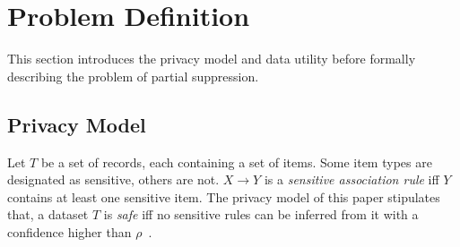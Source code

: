 \section{Problem Definition}
\label{sec:prob}

This section %
introduces the privacy model and data utility before formally describing
the problem of partial suppression.


\subsection{Privacy Model}
Let $T$ be a set of records, each containing a set of items. 
Some item types are designated as sensitive, others are not. 
$X \rightarrow Y$ is 
a {\em sensitive association rule} iff $Y$ contains at least one sensitive 
item. The privacy model of this paper
stipulates that, a dataset $T$ is {\em safe} iff no sensitive rules 
can be inferred from it with a confidence higher than 
$\rho$~\cite{Cao:2010:rho}. 


